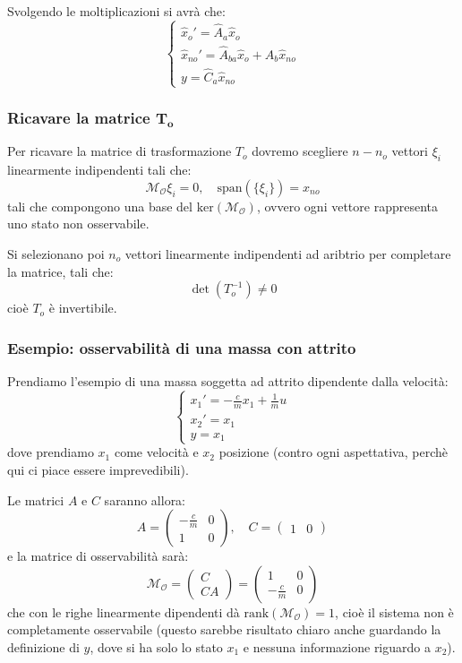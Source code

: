 \documentclass[a4paper,11pt]{article}
\begin{document}
Svolgendo le moltiplicazioni si avrà che:
\[
	\begin{cases}
		\hat{x}_{o}' = \hat{A}_a \hat{x}_{o} \\	
		\hat{x}_{no}' = \hat{A}_{ba} \hat{x}_{o} + \hat{A}_{b} \hat{x}_{no} \\
		y = \hat{C}_a \hat{x}_{no}
	\end{cases}
\]

\subsubsection{Ricavare la matrice $\mathbf{T_o}$}
Per ricavare la matrice di trasformazione $T_o$ dovremo scegliere $n - n_o$ vettori $\xi_i$ linearmente indipendenti tali che:
$$
\mathcal{M}_\mathcal{O} \xi_i = 0, \quad \mathrm{span}\left( \{ \xi_i \} \right) = x_{no}
$$
tali che compongono una base del $\mathrm{ker}(\mathcal{M}_\mathcal{O})$, ovvero ogni vettore rappresenta uno stato non osservabile.

Si selezionano poi $n_o$ vettori linearmente indipendenti ad aribtrio per completare la matrice, tali che:
$$
\det(T_o^{-1}) \neq 0
$$
cioè $T_o$ è invertibile.

\subsubsection{Esempio: osservabilità di una massa con attrito}
Prendiamo l'esempio di una massa soggetta ad attrito dipendente dalla velocità:
\[
	\begin{cases}
		x_1' = -\frac{c}{m} x_1 + \frac{1}{m} u \\ 
		x_2' = x_1 \\
		y = x_1
	\end{cases}
\]
dove prendiamo $x_1$ come velocità e $x_2$ posizione (contro ogni aspettativa, perchè qui ci piace essere imprevedibili).

Le matrici $A$ e $C$ saranno allora:
$$
A = \begin{pmatrix}
	-\frac{c}{m} & 0 \\
	1 & 0
\end{pmatrix}, \quad C = \begin{pmatrix}
	1 & 0
\end{pmatrix}
$$
e la matrice di osservabilità sarà:
$$
\mathcal{M}_\mathcal{O} = \begin{pmatrix}
	C \\ C A
\end{pmatrix} = \begin{pmatrix}
	1 & 0 \\ 
	-\frac{c}{m} & 0
\end{pmatrix}
$$
che con le righe linearmente dipendenti dà $\mathrm{rank}(\mathcal{M}_\mathcal{O}) = 1$, cioè il sistema non è completamente osservabile (questo sarebbe risultato chiaro anche guardando la definizione di $y$, dove si ha solo lo stato $x_1$ e nessuna informazione riguardo a $x_2$).
\end{document}
